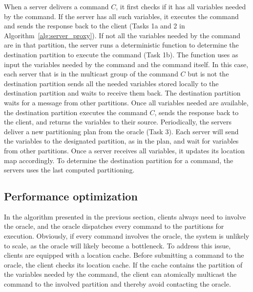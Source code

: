 When a server delivers a command $C$, it first checks if it has all variables needed by the command. If the server has all such variables, it executes the command and sends the response back to the client (Tasks 1a and 2 in Algorithm~\ref{alg:server_proxy}).
If not all the variables needed by the command are in that partition, the server runs a deterministic function to determine the destination partition to execute the command (Task 1b). The function uses as input the variables needed by the command and the command itself.
In this case, each server that is in the multicast group of the command $C$ but is not the destination partition sends all the needed variables stored locally to the destination partition and waits to receive them back. 
The destination partition waits for a message from other partitions. Once all variables needed are available, the destination partition executes the command $C$, sends the response back to the client, and returns the variables to their source.
Periodically, the servers deliver a new partitioning plan from the oracle (Task 3). Each server will send the variables to the designated partition, as in the plan, and wait for variables from other partitions. Once a server receives all variables, it updates its location map accordingly.
To determine the destination partition for a command, the servers uses the last computed partitioning.


\subsection{Performance optimization}
\label{sec:optm}

%
In the algorithm presented in the previous section, clients always need to involve the oracle, and the oracle dispatches every command to the partitions for execution.
Obviously, if every command involves the oracle, the system is unlikely to scale, as the oracle will likely become a bottleneck.
To address this issue, clients are equipped with a location cache.
Before submitting a command to the oracle, the client checks its location cache.
If the cache contains the partition of the variables needed by the command, the client can atomically multicast the command to the involved partition and thereby avoid contacting the oracle. 

